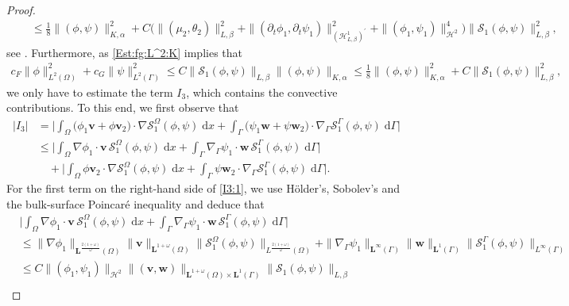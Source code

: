 \documentclass[10pt,reqno]{amsart}
\theoremstyle{remark}
\numberwithin{equation}{section}
\newcommand{\abs}[1]{| #1 |}
\newcommand{\Bigabs}[1]{\Big| #1 \Big|}
\newcommand{\norm}[1]{\| #1 \|}
\newcommand{\bv}{\mathbf{v}}
\newcommand{\bw}{\mathbf{w}}
\newcommand{\intO}{\int_\Omega}
\newcommand{\intG}{\int_\Gamma}
\newcommand{\dx}{\;\mathrm{d}x}
\newcommand{\dG}{\;\mathrm d\Ga}
\newcommand{\delt}{\partial_{t}}
\newcommand{\Grad}{\nabla}
\newcommand{\Gradg}{\nabla_\Ga}
\newcommand{\Om}{\Omega}
\newcommand{\Ga}{\Gamma}
\begin{document}
\begin{proof}
\begin{align*}
        &\quad \leq \frac18\norm{(\phi,\psi)}_{K,\alpha}^2 + C\big(\norm{(\mu_2,\theta_2)}_{L,\beta}^2 + \norm{(\delt\phi_1,\delt\psi_1)}_{(\mathcal{H}^1_{L,\beta})^\prime}^2 + \norm{(\phi_1,\psi_1)}_{\mathcal{H}^2}^4\big)\norm{\mathcal{S}_1(\phi,\psi)}_{L,\beta}^2, \nonumber
    \end{align*}
    see \cite[Eqns.~(5.62)--(5.63)]{Stange2025}.
    Furthermore, as \eqref{Est:fg:L^2:K} implies that
    \begin{align}\label{Est:PhiPsi:L2}
    	c_F\norm{\phi}_{L^2(\Om)}^2 + c_G\norm{\psi}_{L^2(\Ga)}^2\leq C\norm{\mathcal{S}_1(\phi,\psi)}_{L,\beta}\norm{(\phi,\psi)}_{K,\alpha} \leq \frac18\norm{(\phi,\psi)}_{K,\alpha}^2 + C\norm{\mathcal{S}_1(\phi,\psi)}_{L,\beta}^2,
    \end{align}
    we only have to estimate the term $I_3$, which contains the convective contributions. To this end, we first observe that
    \begin{align}\label{I3:1}
        \abs{I_3} &= \Bigabs{\intO \big(\phi_1\mathbf{v} + \phi\mathbf{v}_2\big)\cdot\Grad\mathcal{S}_1^\Om(\phi,\psi)\dx + \intG \big(\psi_1\mathbf{w} + \psi\mathbf{w}_2\big)\cdot\Gradg\mathcal{S}_1^\Ga(\phi,\psi)\dG} \nonumber \\
        &\leq \Bigabs{\intO \Grad\phi_1\cdot\bv\,\mathcal{S}_1^\Om(\phi,\psi)\dx + \intG \Gradg\psi_1\cdot\bw\,\mathcal{S}_1^\Ga(\phi,\psi)\dG} \\
        &\quad + \Bigabs{\intO \phi\bv_2\cdot\Grad\mathcal{S}_1^\Om(\phi,\psi)\dx + \intG \psi\bw_2\cdot\Gradg\mathcal{S}_1^\Ga(\phi,\psi)\dG}. \nonumber
    \end{align}
    For the first term on the right-hand side of \eqref{I3:1}, we use Hölder's, Sobolev's and the bulk-surface Poincar\'{e} inequality and deduce that
    \begin{align*}
        &\Bigabs{\intO \Grad\phi_1\cdot\bv\,\mathcal{S}_1^\Om(\phi,\psi)\dx + \intG \Gradg\psi_1\cdot\bw\,\mathcal{S}_1^\Ga(\phi,\psi)\dG} \\
        &\leq \norm{\Grad\phi_1}_{\mathbf{L}^{\frac{2(1+\omega)}{\omega}}(\Om)}\norm{\bv}_{\mathbf{L}^{1+\omega}(\Om)}\norm{\mathcal{S}_1^\Om(\phi,\psi)}_{L^{\frac{2(1+\omega)}{\omega}}(\Om)} + \norm{\Gradg\psi_1}_{\mathbf{L}^\infty(\Ga)}\norm{\bw}_{\mathbf{L}^1(\Ga)}\norm{\mathcal{S}_1^\Ga(\phi,\psi)}_{L^\infty(\Ga)} \\
        &\leq C\norm{(\phi_1,\psi_1)}_{\mathcal{H}^2}\norm{(\bv,\bw)}_{\mathbf{L}^{1+\omega}(\Om)\times\mathbf{L}^1(\Ga)}\norm{\mathcal{S}_1(\phi,\psi)}_{L,\beta} \\

\end{align*}
\end{proof}
\end{document}
